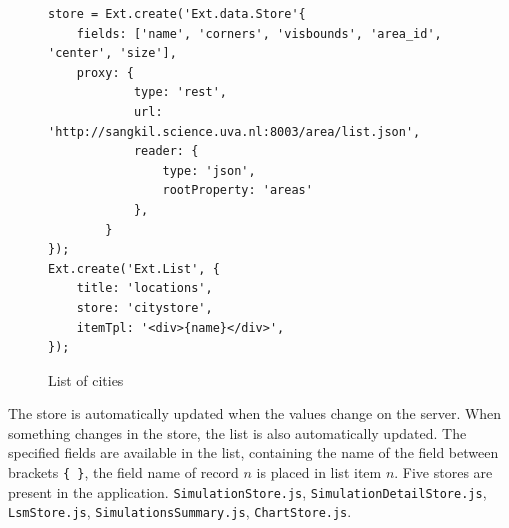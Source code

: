 \begin{figure}[h!]
\begin{lstlisting}
store = Ext.create('Ext.data.Store'{
    fields: ['name', 'corners', 'visbounds', 'area_id', 'center', 'size'],
	proxy: {
			type: 'rest',
			url: 'http://sangkil.science.uva.nl:8003/area/list.json',
			reader: {
				type: 'json',
				rootProperty: 'areas'
			},
		}
});
Ext.create('Ext.List', {
	title: 'locations',
	store: 'citystore',
	itemTpl: '<div>{name}</div>',
});
\end{lstlisting}
\caption{List of cities}
\label{fig:sencha}
\end{figure}
The store is automatically updated when the values change on the server. When something changes in the store, the list is also automatically updated. The specified fields are available in the list, containing the name of the field between brackets \texttt{\{ \}}, the field name of record $n$ is placed in list item $n$. Five stores are present in the application. \texttt{SimulationStore.js}, \texttt{SimulationDetailStore.js}, \texttt{LsmStore.js}, \texttt{SimulationsSummary.js}, \texttt{ChartStore.js}. 
